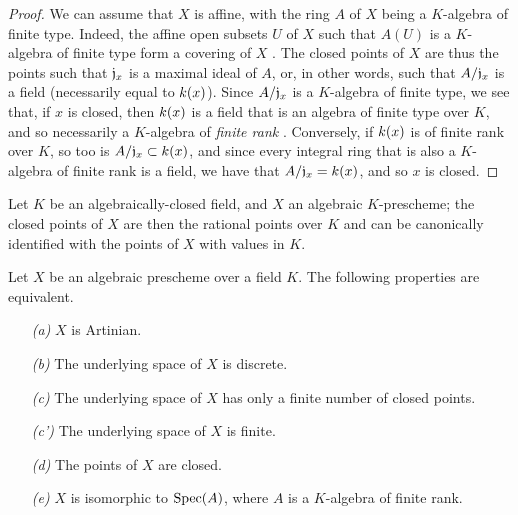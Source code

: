 \begin{proof}
\label{proof-1.6.4.2}
We can assume that $X$ is affine, with the ring $A$ of $X$ being a $K$-algebra of finite type.
Indeed, the affine open subsets $U$ of $X$ such that $A(U)$ is a $K$-algebra of finite type form a covering of $X$ .
The closed points of $X$ are thus the points such that $\mathfrak{j}_x$ is a maximal ideal of $A$, or, in other words, such that $A/\mathfrak{j}_x$ is a field (necessarily equal to $k(x)$).
Since $A/\mathfrak{j}_x$ is a $K$-algebra of finite type, we see that, if $x$ is closed, then $k(x)$ is a field that is an algebra of finite type over $K$, and so necessarily a $K$-algebra of \emph{finite rank} \cite{I-21}.
Conversely, if $k(x)$ is of finite rank over $K$, so too is $A/\mathfrak{j}_x\subset k(x)$, and since every integral ring that is also a $K$-algebra of finite rank is a field, we have that $A/\mathfrak{j}_x=k(x)$, and so $x$ is closed.
\end{proof}

\begin{cor}[6.4.3]
\label{1.6.4.3}
Let $K$ be an algebraically-closed field, and $X$ an algebraic $K$-prescheme;
the closed points of $X$ are then the rational points over $K$  and can be canonically identified with the points of $X$ with values in $K$.
\end{cor}

\begin{prop}[6.4.4]
\label{1.6.4.4}
Let $X$ be an algebraic prescheme over a field $K$.
The following properties are equivalent.
\begin{enumerate}
    \item[\emph{(a)}] $X$ is Artinian.
    \item[\emph{(b)}] The underlying space of $X$ is discrete.
    \item[\emph{(c)}] The underlying space of $X$ has only a finite number of closed points.
    \item[\emph{(c')}] The underlying space of $X$ is finite.
    \item[\emph{(d)}] The points of $X$ are closed.
    \item[\emph{(e)}] $X$ is isomorphic to ${\mathop{\mathrm{Spec}}\nolimits}(A)$, where $A$ is a $K$-algebra of finite rank.
\end{enumerate}
\end{prop}

